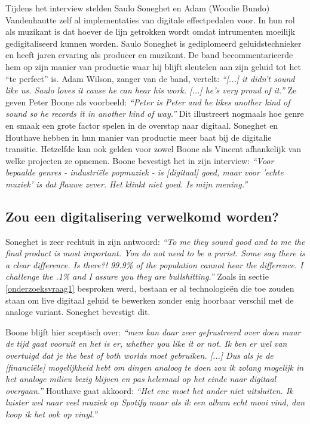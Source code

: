 Tijdens het interview stelden Saulo Soneghet en Adam (Woodie Bundo) Vandenhautte zelf al implementaties van digitale effectpedalen voor. In hun rol als muzikant is dat hoever de lijn getrokken wordt omdat intrumenten moeilijk gedigitaliseerd kunnen worden. Saulo Soneghet is gediplomeerd geluidstechnieker en heeft jaren ervaring als producer en muzikant. De band becommentarieerde hem op zijn manier van productie waar hij blijft sleutelen aan zijn geluid tot het ``te perfect'' is. Adam Wilson, zanger van de band, vertelt: \textit{``[...] it didn't sound like us. Saulo loves it cause he can hear his work. [...] he's very proud of it.''} Ze geven Peter Boone als voorbeeld: \textit{``Peter is Peter and he likes another kind of sound so he records it in another kind of way.''} Dit illustreert nogmaals hoe genre en smaak een grote factor spelen in de overstap naar digitaal. Soneghet en Houthave hebben in hun manier van productie meer baat bij de digitalie transitie. Hetzelfde kan ook gelden voor zowel Boone als Vincent afhankelijk van welke projecten ze opnemen. Boone bevestigt het in zijn interview: \textit{``Voor bepaalde genres - industriële popmuziek - is [digitaal] goed, maar voor 'echte muziek' is dat flauwe zever. Het klinkt niet goed. Is mijn mening.''}

\subsection{Zou een digitalisering verwelkomd worden?}

Soneghet is zeer rechtuit in zijn antwoord: \textit{``To me they sound good and to me the final product is most important. You do not need to be a purist. Some say there is a clear difference. Is there?! 99.9\% of the population cannot hear the difference. I challenge the .1\% and I assure you they are bullshitting.''} \autocite{vagabundos} Zoals in sectie \ref{onderzoeksvraag1} besproken werd, bestaan er al technologieën die toe zouden staan om live digitaal geluid te bewerken zonder enig hoorbaar verschil met de analoge variant. Soneghet bevestigt dit.

Boone blijft hier sceptisch over: \textit{``men kan daar zeer gefrustreerd over doen maar de tijd gaat vooruit en het is er, whether you like it or not. Ik ben er wel van overtuigd dat je the best of both worlds moet gebruiken. [...] Dus als je de [financiële] mogelijkheid hebt om dingen analoog te doen zou ik zolang mogelijk in het analoge milieu bezig blijven en pas helemaal op het einde naar digitaal overgaan.''} \autocite{peterboone} Houthave gaat akkoord: \textit{``Het ene moet het ander niet uitsluiten. Ik luister wel naar veel muziek op Spotify maar als ik een album echt mooi vind, dan koop ik het ook op vinyl.''} \autocite{thomashouthave}


